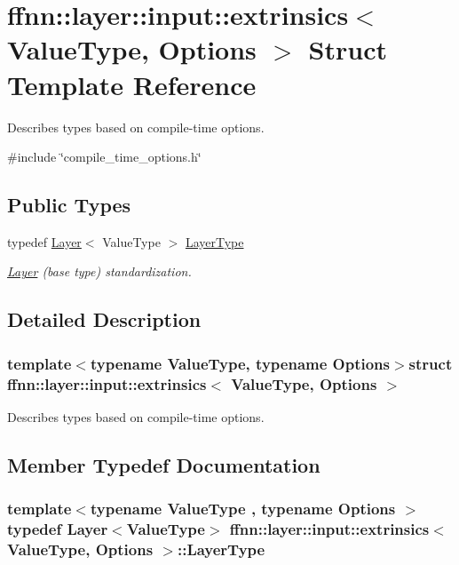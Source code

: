 \hypertarget{structffnn_1_1layer_1_1input_1_1extrinsics}{\section{ffnn\-:\-:layer\-:\-:input\-:\-:extrinsics$<$ Value\-Type, Options $>$ Struct Template Reference}
\label{structffnn_1_1layer_1_1input_1_1extrinsics}
}


Describes types based on compile-\/time options.  




{\ttfamily \#include \char`\"{}compile\-\_\-time\-\_\-options.\-h\char`\"{}}

\subsection*{Public Types}
\begin{DoxyCompactItemize}
\item 
typedef \hyperlink{classffnn_1_1layer_1_1_layer}{Layer}$<$ Value\-Type $>$ \hyperlink{structffnn_1_1layer_1_1input_1_1extrinsics_a79fa07766ac4114ac8f8c2ea092c47f5}{Layer\-Type}
\begin{DoxyCompactList}\small\item\em \hyperlink{classffnn_1_1layer_1_1_layer}{Layer} (base type) standardization. \end{DoxyCompactList}\end{DoxyCompactItemize}


\subsection{Detailed Description}
\subsubsection*{template$<$typename Value\-Type, typename Options$>$struct ffnn\-::layer\-::input\-::extrinsics$<$ Value\-Type, Options $>$}

Describes types based on compile-\/time options. 

\subsection{Member Typedef Documentation}
\hypertarget{structffnn_1_1layer_1_1input_1_1extrinsics_a79fa07766ac4114ac8f8c2ea092c47f5}{
\subsubsection[{Layer\-Type}]{\setlength{\rightskip}{0pt plus 5cm}template$<$typename Value\-Type , typename Options $>$ typedef {\bf Layer}$<$Value\-Type$>$ {\bf ffnn\-::layer\-::input\-::extrinsics}$<$ Value\-Type, Options $>$\-::{\bf Layer\-Type}}}\label{structffnn_1_1layer_1_1input_1_1extrinsics_a79fa07766ac4114ac8f8c2ea092c47f5}


